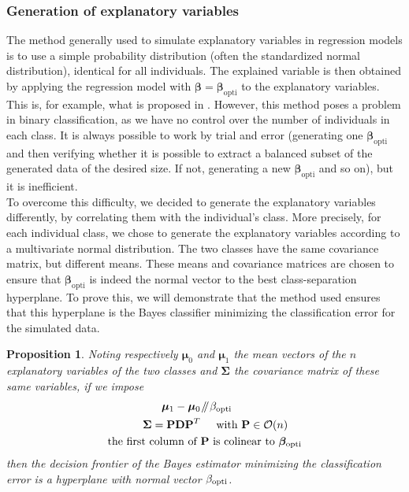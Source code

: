 \documentclass[preprint,12pt]{elsarticle}
\newtheorem{theorem}{Proposition}
\newcommand{\parallelsum}{\mathbin{\!/\mkern-5mu/\!}}
\begin{document}
\subsubsection{Generation of explanatory variables}
The method generally used to simulate explanatory variables in regression models is to use a simple probability distribution (often the standardized normal distribution), identical for all individuals. The explained variable is then obtained by applying the regression model with $\bm{\beta} = \bm{\beta}_{\text{opti}}$ to the explanatory variables. This is, for example, what is proposed in \cite{picto}. However, this method poses a problem in binary classification, as we have no control over the number of individuals in each class. It is always possible to work by trial and error (generating one $\bm{\beta}_{\text{opti}}$ and then verifying whether it is possible to extract a balanced subset of the generated data of the desired size. If not, generating a new $\bm{\beta}_{\text{opti}}$ and so on), but it is inefficient.\\
\indent To overcome this difficulty, we decided to generate the explanatory variables differently, by correlating them with the individual's class. More precisely, for each individual class, we chose to generate the explanatory variables according to a multivariate normal distribution. The two classes have the same covariance matrix, but different means. These means and covariance matrices are chosen to ensure that $\bm{\beta}_{\text{opti}}$ is indeed the normal vector to the best class-separation hyperplane. To prove this, we will demonstrate that the method used ensures that this hyperplane is the Bayes classifier minimizing the classification error for the simulated data.\\
\begin{theorem}
Noting respectively $\bm{\mu}_0$ and $\bm{\mu}_1$ the mean vectors of the $n$ explanatory variables of the two classes and $\bm{\Sigma}$ the covariance matrix of these same variables, if we impose
\begin{align}
    \bm{\mu}_1 - \bm{\mu}_0 & \parallelsum \beta_{\textnormal{opti}}\\
    \bm{\Sigma} = \mathbf{P D P}^T &\hspace{0.5 cm} \textnormal{with } \mathbf{P} \in \mathcal{O}(n)\\
  \textnormal{the first column of }&  \mathbf{P} \textnormal{ is colinear to } \bm{\beta}_{\textnormal{opti}}
\end{align}
\noindent then the decision frontier of the Bayes estimator minimizing the classification error is a hyperplane with normal vector $\bf{\beta}_{\textnormal{opti}}$.
\end{theorem}
\end{document}

